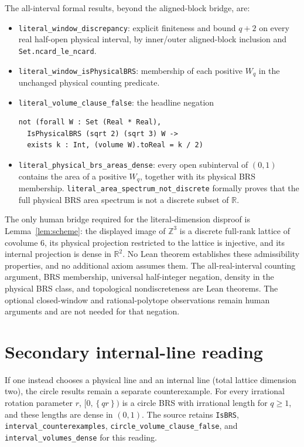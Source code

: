 \documentclass[11pt]{article}
\newcommand{\fr}[1]{\left\{#1\right\}}
\newcommand{\R}{\mathbb R}
\newcommand{\Z}{\mathbb Z}
\begin{document}
The all-interval formal results, beyond the aligned-block bridge, are:
\begin{itemize}
\item \nolinkurl{literal_window_discrepancy}: explicit finiteness and
bound $q+2$ on every real half-open physical interval, by inner/outer
aligned-block inclusion and \nolinkurl{Set.ncard_le_ncard}.
\item \nolinkurl{literal_window_isPhysicalBRS}: membership of each
positive $W_q$ in the unchanged physical counting predicate.
\item \nolinkurl{literal_volume_clause_false}: the headline negation
\begin{lstlisting}
not (forall W : Set (Real * Real),
  IsPhysicalBRS (sqrt 2) (sqrt 3) W ->
  exists k : Int, (volume W).toReal = k / 2)
\end{lstlisting}
\item \nolinkurl{literal_physical_brs_areas_dense}: every open subinterval
of $(0,1)$ contains the area of a positive $W_q$, together with its
physical BRS membership. \nolinkurl{literal_area_spectrum_not_discrete} formally proves that the
full physical BRS area spectrum is not a discrete subset of $\R$.
\end{itemize}

The only human bridge required for the literal-dimension disproof is
Lemma~\ref{lem:scheme}: the displayed image of $\Z^3$ is a discrete
full-rank lattice of covolume $6$, its physical projection restricted to
the lattice is injective, and its internal projection is dense in
$\R^2$. No Lean theorem establishes these admissibility properties, and
no additional axiom assumes them. The all-real-interval counting argument,
BRS membership, universal half-integer negation, density in the
physical BRS class, and topological nondiscreteness are Lean theorems. The optional closed-window and
rational-polytope observations remain human arguments and are not needed
for that negation.

\section{Secondary internal-line reading}\label{sec:secondary}
If one instead chooses a physical line and an internal line (total
lattice dimension two), the circle results remain a separate
counterexample. For every irrational rotation parameter $r$,
$[0,\fr{qr})$ is a circle BRS with irrational length for $q\ge1$,
and these lengths are dense in $(0,1)$. The source retains
\nolinkurl{IsBRS}, \nolinkurl{interval_counterexamples},
\nolinkurl{circle_volume_clause_false}, and
\nolinkurl{interval_volumes_dense} for this reading.
\end{document}
